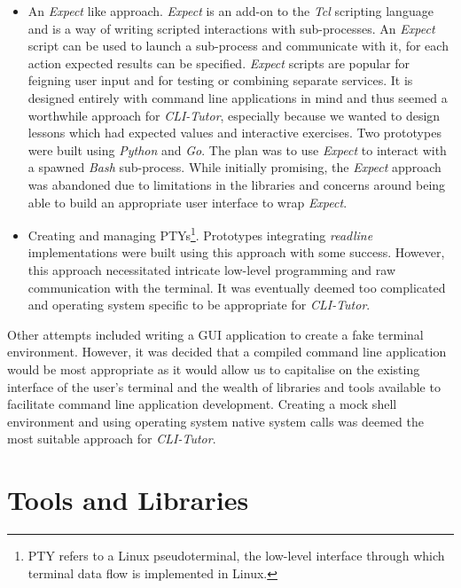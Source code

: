 \begin{itemize} \item An \textit{Expect}\cite{libes1995exploring} like
    approach. \textit{Expect} is an add-on to the \textit{Tcl} scripting
    language and is a way of writing scripted interactions with sub-processes.
    An \textit{Expect} script can be used to launch a sub-process and
    communicate with it, for each action expected results can be specified.
    \textit{Expect} scripts are popular for feigning user input and for testing
    or combining separate services. It is designed entirely with command line
    applications in mind and thus seemed a worthwhile approach for
    \textit{CLI-Tutor}, especially because we wanted to design lessons which
    had expected values and interactive exercises. Two prototypes were built
    using  \textit{Python} and \textit{Go}. The plan was to use \textit{Expect}
    to interact with a spawned \textit{Bash} sub-process. While initially
    promising, the \textit{Expect} approach was abandoned due to limitations in
    the libraries and concerns around being able to build an appropriate user
    interface to wrap \textit{Expect}.

    \item Creating and managing PTYs\footnote{PTY refers to a Linux
        pseudoterminal, the low-level interface through which terminal data
    flow is implemented in Linux.}. Prototypes integrating \textit{readline}
    implementations were built using this approach with some success. However,
    this approach necessitated intricate low-level programming and raw
    communication with the terminal. It was eventually deemed too complicated
    and operating system specific to be appropriate for \textit{CLI-Tutor}. 

\end{itemize}

    Other attempts included writing a GUI application to create a fake terminal
    environment. However, it was decided that a compiled command line
    application would be most appropriate as it would allow us to capitalise on
    the existing interface of the user's terminal and the wealth of libraries
    and tools available to facilitate command line application development.
    Creating a mock shell environment and using operating system native system
    calls was deemed the most suitable approach for \textit{CLI-Tutor}.

\section{Tools and Libraries}
\label{sec:tools}

